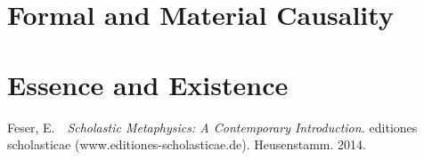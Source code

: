 \documentclass[twocolumn]{article}
\begin{document}
\section{Formal and Material Causality}

\section{Essence and Existence}



\begin{thebibliography}{}

Feser, E.\ \ {\it Scholastic Metaphysics: A Contemporary Introduction.}
      editiones scholasticae (www.editiones-scholasticae.de). Heusenstamm.
      2014.

\end{thebibliography}
\end{document}
